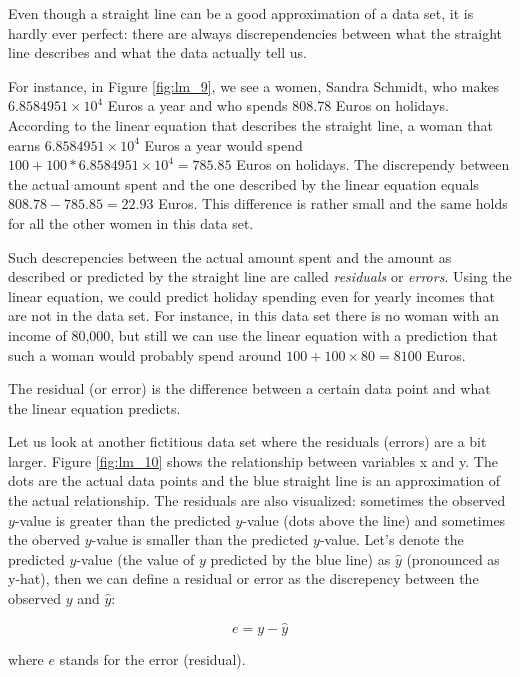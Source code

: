 \documentclass[]{report}\usepackage[]{graphicx}\usepackage[]{color}
\begin{document}
Even though a straight line can be a good approximation of a data set, it is hardly ever perfect: there are always discrependencies between what the straight line describes and what the data actually tell us.

For instance, in Figure \ref{fig:lm_9}, we see a women, Sandra Schmidt, who makes \ensuremath{6.8584951\times 10^{4}} Euros a year and who spends 808.78 Euros on holidays. According to the linear equation that describes the straight line, a woman that earns \ensuremath{6.8584951\times 10^{4}} Euros a year would spend $100 + 100 * \ensuremath{6.8584951\times 10^{4}}= 785.85$ Euros on holidays. The discrependy between the actual amount spent and the one described by the linear equation equals $808.78-785.85=22.93$ Euros. This difference is rather small and the same holds for all the other women in this data set.

Such descrepencies between the actual amount spent and the amount as described or predicted by the straight line are called \textit{residuals} or \textit{errors}. Using the linear equation, we could predict holiday spending even for yearly incomes that are not in the data set. For instance, in this data set there is no woman with an income of 80,000, but still we can use the linear equation with a prediction that such a woman would probably spend around $100+100\times 80= 8100$ Euros.

The residual (or error) is the difference between a certain data point and what the linear equation predicts.


Let us look at another fictitious data set where the residuals (errors) are a bit larger. Figure \ref{fig:lm_10} shows the relationship between variables x and y. The dots are the actual data points and the blue straight line is an approximation of the actual relationship. The residuals are also visualized: sometimes the observed $y$-value is greater than the predicted $y$-value (dots above the line) and sometimes the oberved $y$-value is smaller than the predicted $y$-value. Let's denote the predicted $y$-value (the value of $y$ predicted by the blue line) as $\hat{y}$ (pronounced as y-hat), then we can define a residual or error as the discrepency between the observed $y$ and $\hat{y}$:

\begin{equation}
e = y - \hat{y}
\end{equation}

where $e$ stands for the error (residual).
\end{document}
